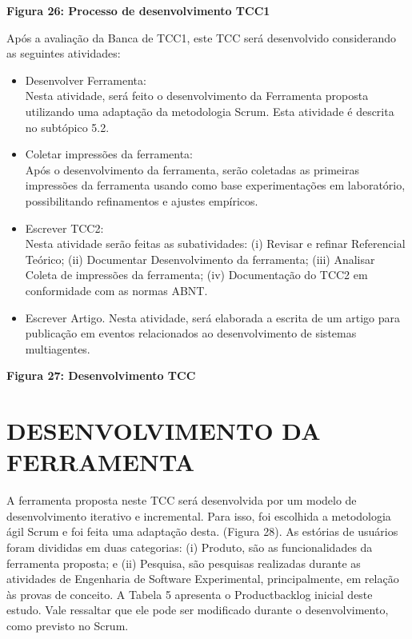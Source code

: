 \textbf{Figura 26: Processo de desenvolvimento TCC1}

Após a avaliação da Banca de TCC1, este TCC será desenvolvido considerando as seguintes atividades:

\begin{itemize}
\item Desenvolver Ferramenta:\\
Nesta atividade, será feito o desenvolvimento da Ferramenta proposta utilizando uma adaptação da metodologia Scrum. Esta atividade é descrita no subtópico 5.2.

\item Coletar impressões da ferramenta:\\
Após o desenvolvimento da ferramenta, serão coletadas as primeiras impressões da ferramenta usando como base experimentações em laboratório, possibilitando refinamentos e ajustes empíricos.

\item Escrever TCC2:\\
Nesta atividade serão feitas as subatividades: (i) Revisar e  refinar Referencial Teórico; (ii) Documentar Desenvolvimento da ferramenta; (iii) Analisar Coleta de impressões da ferramenta; (iv) Documentação do TCC2 em conformidade com as normas ABNT.

\item Escrever Artigo.
Nesta atividade, será elaborada a escrita de um artigo para publicação em eventos relacionados ao desenvolvimento de sistemas multiagentes.

\end{itemize}

\textbf{Figura 27: Desenvolvimento TCC}

\section{DESENVOLVIMENTO DA FERRAMENTA}
A ferramenta proposta neste TCC será  desenvolvida por um modelo de desenvolvimento iterativo e incremental. Para isso, foi escolhida a metodologia ágil  Scrum e foi feita uma adaptação desta. (Figura 28). As estórias de usuários foram divididas em duas categorias: (i) Produto, são as funcionalidades da ferramenta proposta; e (ii) Pesquisa, são pesquisas realizadas durante as atividades de Engenharia de Software Experimental, principalmente, em relação às provas de conceito. A Tabela 5 apresenta o Productbacklog inicial deste estudo. Vale ressaltar que ele pode ser modificado durante o desenvolvimento, como previsto no Scrum.

